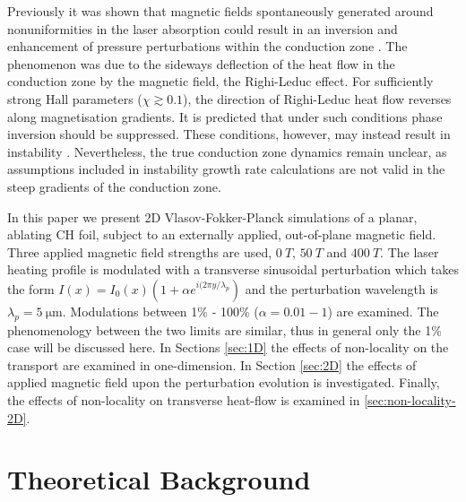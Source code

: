 \documentclass[aip,reprint]{revtex4-1}
\begin{document}
Previously it was shown that magnetic fields spontaneously generated around nonuniformities in the laser absorption could result in an inversion and enhancement of pressure perturbations  within the conduction zone \cite{Hill2018}. The phenomenon was due to the sideways deflection of the heat flow in the conduction zone by the magnetic field, the Righi-Leduc effect. For sufficiently strong Hall parameters ($\chi \gtrsim 0.1$), the direction of Righi-Leduc heat flow reverses along magnetisation gradients. It is predicted that under such conditions phase inversion should be suppressed. These conditions, however, may instead result in instability \cite{Fruchtman1992,Bissell2010a}. Nevertheless, the true conduction zone dynamics remain unclear, as assumptions included in instability growth rate calculations are not valid in the steep gradients of the conduction zone.


In this paper we present 2D Vlasov-Fokker-Planck simulations of a planar, ablating CH foil, subject to an externally applied, out-of-plane magnetic field.  Three applied magnetic field strengths are used, $\SI{0}{T}$, $\SI{50}{T}$ and $\SI{400}{T}$. The laser heating profile is modulated with a transverse sinusoidal perturbation which takes the form $I(x) = I_0(x)(1 + \alpha e^{i(2\pi y/\lambda_p})$ and the perturbation wavelength is $\lambda_p = \SI{5}{\micro\meter}$. Modulations between 1\% - 100\% ($\alpha = 0.01-1$) are examined. The phenomenology between the two limits are similar, thus in general only the 1\% case will be discussed here.  In Sections \ref{sec:1D} the effects of non-locality on the transport are examined in one-dimension. In Section \ref{sec:2D} the effects of applied magnetic field upon the perturbation evolution is investigated. Finally, the effects of non-locality on transverse heat-flow is examined in \ref{sec:non-locality-2D}.

\section{Theoretical Background}

\end{document}
